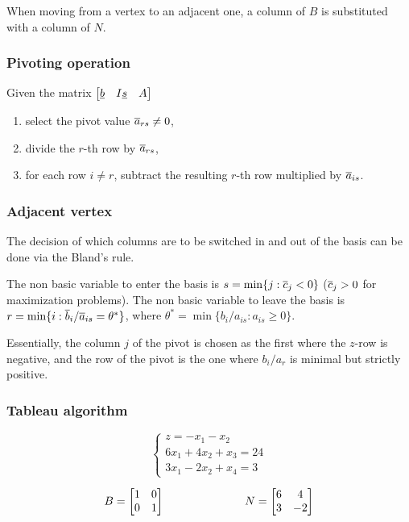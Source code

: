 When moving from a vertex to an adjacent one, a column of $B$ is substituted with a column of $N$.

\subsubsection{Pivoting operation}

Given the matrix $\begin{bmatrix} \underline{b} & I \underline{s} & A \end{bmatrix}$

\begin{enumerate}
    \item select the pivot value $\overline{a}_{rs} \ne 0$,
    \item divide the $r$-th row by $\overline{a}_{rs}$,
    \item for each row $i \ne r$, subtract the resulting $r$-th row multiplied by $\overline{a}_{is}$.
\end{enumerate}

\subsubsection{Adjacent vertex}

The decision of which columns are to be switched in and out of the basis can be done via the Bland's rule.

The non basic variable to enter the basis is $s = \min\{ j : \overline{c}_j < 0 \}$ ($\overline{c}_j > 0$ for maximization problems).
The non basic variable to leave the basis is $r = \min\{ i : \overline{b}_i / \overline{a}_{is} = \theta^* \}$, where $\theta^* = \min\{b_i / a_{is} : a_{is} \ge 0\}$.

Essentially, the column $j$ of the pivot is chosen as the first where the $z$-row is negative, and the row of the pivot is the one where $b_i / a_r$ is minimal but strictly positive.

\subsubsection{Tableau algorithm}

$$
\begin{cases}
    z = - x_1 - x_2 \\
    6 x_1 + 4 x_2 + x_3 = 24 \\
    3 x_1 - 2 x_2 + x_4 = 3
\end{cases}
$$

$$
B=
\begin{bmatrix}
    1 & 0 \\
    0 & 1
\end{bmatrix}
\hspace{2.5cm}
N=
\begin{bmatrix}
    6 & 4 \\
    3 & -2
\end{bmatrix}
$$


